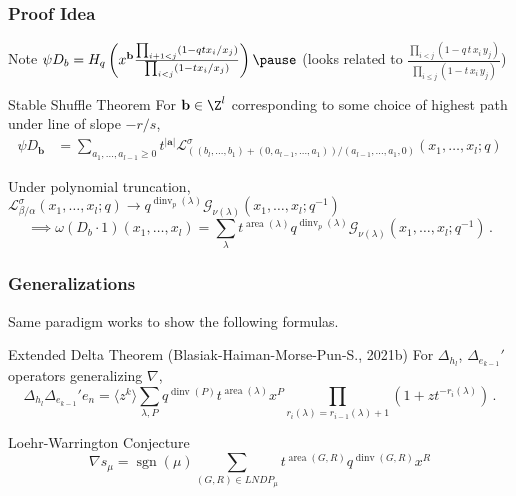 \documentclass{beamer}
\DeclareMathOperator{\area}{area}
\DeclareMathOperator{\dinv}{dinv}
\newcommand{\Gcal}{\mathcal{G}}
\newcommand{\Lcal}{{\mathcal L}}
\newcommand{\bb}{{\mathbf b}}
\newcommand{\aA}{{\mathbf a}}
\DeclareMathOperator{\sgn}{sgn}
\newcounter{c}
\begin{document}
\begin{frame}
  \frametitle{Proof Idea}
Note \(\psi D_b = H_q\left(x^{\bb} \frac{\prod_{i+1 < j} (1-qt x_i/x_j)}{\prod_{i<j} (1-t
    x_i/x_j)} \right)\pause
\) (looks related to \(\frac{\prod _{i<j} (1 - q\, t\, x_{i} \, y_{j})}{\prod
          _{i\leq j} (1 - t\, x_{i}\, y_{j})} \))\pause
\begin{block}{Stable Shuffle Theorem}
    For \(\bb \in \Z^l\) corresponding to some choice of highest path
    under line of slope \(-r/s\),
    \begin{align*}
      \psi D_\bb &= \sum_{a_1,\ldots,a_{l-1} \geq 0}
t^{|\aA|} \Lcal^\sigma_{((b_l,\ldots,b_1)+(0,a_{l-1},\ldots,a_1))/(a_{l-1},\ldots,a_1,0)}(x_1,\ldots,x_l;q)
    \end{align*}
  \end{block}\pause
  Under polynomial truncation,
  \(\Lcal^\sigma_{\beta/\alpha}(x_1,\ldots,x_l;q) \to
  q^{\dinv_p(\lambda)}\Gcal_{\nu(\lambda)}(x_1,\ldots,x_l;q^{-1})\)\pause \[
    \implies \omega(D_b \cdot 1)(x_1,\ldots,x_l) = \sum_\lambda
    t^{\area(\lambda)}q^{\dinv_p(\lambda)} \Gcal_{\nu(\lambda)}(x_1,\ldots,x_l;q^{-1})\,.
  \]
\end{frame}
\begin{frame}
  \frametitle{Generalizations}
  Same paradigm works to show the following formulas.\pause
  \begin{block}{Extended Delta Theorem (Blasiak-Haiman-Morse-Pun-S.,
      2021b)}
    For \(\Delta_{h_l}\), \(\Delta_{e_{k-1}}'\) operators generalizing \(\nabla\),
    \[\Delta_{h_l} \Delta_{e_{k-1}}' e_n
      = \langle z^k \rangle \sum_{\lambda,P} q^{\dinv(P)}
      t^{\area(\lambda)} x^P \prod_{r_i(\lambda)=r_{i-1}(\lambda)+1}
      (1+zt^{-r_i(\lambda)})\,.\]
  \end{block}\pause
  \begin{block}{Loehr-Warrington Conjecture}
    \[\nabla s_\mu = \sgn(\mu)\sum_{(G,R)
        \in LNDP_\mu} t^{\area(G,R)} q^{\dinv(G,R)} x^R\]
  \end{block}
\end{frame}
\end{document}
